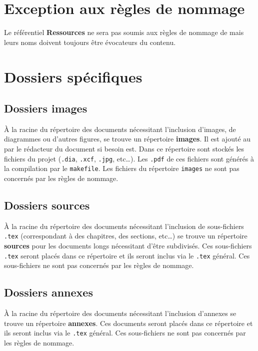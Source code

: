 \section{Exception aux règles de nommage}

Le référentiel \textbf{Ressources} ne sera pas soumis aux règles de nommage de \nomEquipe{} mais leurs noms doivent toujours être évocateurs du contenu.

\section{Dossiers spécifiques}

\subsection{Dossiers images}

\`{A} la racine du répertoire des documents nécessitant l'inclusion d'images, de diagrammes ou
d'autres figures, se trouve un répertoire \textbf{images}. Il est ajouté au \git{} par le
rédacteur du document si besoin est. Dans ce répertoire sont stockés les fichiers du projet
(\verb+.dia+, \verb+.xcf+, \verb+.jpg+, etc\dots). Les \verb+.pdf+ de ces fichiers sont générés
à la compilation par le \verb+makefile+.
Les fichiers du répertoire \verb+images+ ne sont pas concernés par les règles de nommage.

\subsection{Dossiers sources}

\`{A} la racine du répertoire des documents nécessitant l'inclusion de sous-fichiers \verb+.tex+
(correspondant à des chapitres, des sections, etc\dots) se trouve un répertoire \textbf{sources} pour
les documents longs nécessitant d'être subdivisés. 
Ces sous-fichiers \verb+.tex+ seront placés dans ce répertoire et ils seront inclus via
le \verb+.tex+ général. Ces sous-fichiers ne sont pas concernés par les règles de nommage.

\subsection{Dossiers annexes}

\`{A} la racine du répertoire des documents nécessitant l'inclusion d'annexes se trouve un répertoire \textbf{annexes}.
Ces documents seront placés dans ce répertoire et ils seront inclus via
le \verb+.tex+ général. Ces sous-fichiers ne sont pas concernés par les règles de nommage.

